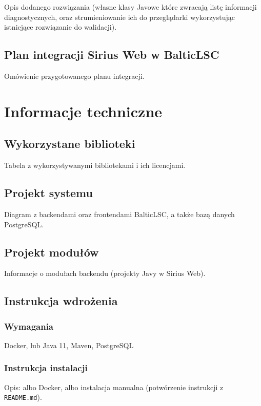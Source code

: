 Opis dodanego rozwiązania (własne klasy Javowe które zwracają listę informacji
diagnostycznych, oraz strumieniowanie ich do przeglądarki wykorzystując
istniejące rozwiązanie do walidacji).

\section{Plan integracji Sirius Web w BalticLSC}

Omówienie przygotowanego planu integracji.

\chapter{Informacje techniczne}

\section{Wykorzystane biblioteki}

Tabela z wykorzystywanymi bibliotekami i ich licencjami.

\section{Projekt systemu}

Diagram z backendami oraz frontendami BalticLSC, a także bazą danych
PostgreSQL\@.

\section{Projekt modułów}

Informacje o modułach backendu (projekty Javy w Sirius Web).

\section{Instrukcja wdrożenia}

\subsection{Wymagania}

Docker, lub Java 11, Maven, PostgreSQL

\subsection{Instrukcja instalacji}

Opis: albo Docker, albo instalacja manualna (potwórzenie instrukcji z
\texttt{README.md}).

